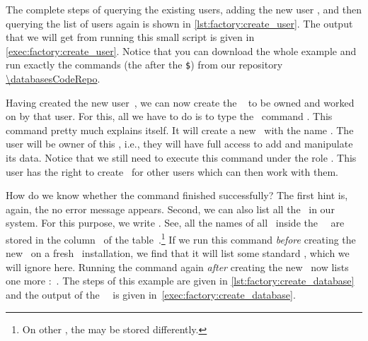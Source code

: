 The complete steps of querying the existing users, adding the new user , and then querying the list of users again is shown in \cref{lst:factory:create_user}.
The output that we will get from running this small script is given in \cref{exec:factory:create_user}.
Notice that you can download the whole example and run exactly the commands (the {\color{listing-tool-command}{red text}} after the {\color{listing-tool-command}\texttt{\$}}) from our repository \url{\databasesCodeRepo}.

%
%
\begin{sloppypar}%
Having created the new user~, we can now create the \db\  to be owned and worked on by that user.
For this, all we have to do is to type the \sql\ command .
This command pretty much explains itself.
It will create a new \db\ with the name .
The user  will be owner of this \db, i.e., they will have full access to add and manipulate its data.
Notice that we still need to execute this command under the  role .
This user has the right to create \dbs\ for other users which can then work with them.%
\end{sloppypar}%
%
How do we know whether the command finished successfully?
The first hint is, again, the no error message appears.
Second, we can also list all the \dbs\ in our system.
For this purpose, we write .
See, all the names of all \dbs\ inside the \postgresql\ \dbms\ are stored in the column~ of the table~.\footnote{%
On other , the  may be stored differently.}
If we run this command \emph{before} creating the new \db\ on a fresh \postgresql\ installation, we find that it will list some standard \dbs, which we will ignore here.
Running the command again \emph{after} creating the new \db\ now lists one more \db:~.
The steps of this example are given in \cref{lst:factory:create_database} and the output of the \psql\ \client\ is given in~\cref{exec:factory:create_database}.%
%
\FloatBarrier%
\endhsection%
%
